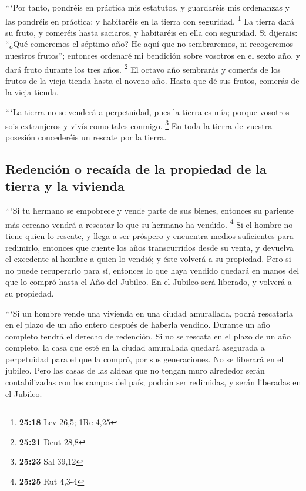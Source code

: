 \begin{paracol}{2}
 ``\,`Por tanto, pondréis en práctica mis estatutos, y
guardaréis mis ordenanzas y las pondréis en práctica; y habitaréis en la
tierra con seguridad. \footnote{\textbf{25:18} Lev 26,5; 1Re 4,25}
 La tierra dará su fruto, y comeréis hasta saciaros, y
habitaréis en ella con seguridad.  Si dijerais: ``¿Qué
comeremos el séptimo año? He aquí que no sembraremos, ni recogeremos
nuestros frutos'';  entonces ordenaré mi bendición sobre
vosotros en el sexto año, y dará fruto durante los tres años.
\footnote{\textbf{25:21} Deut 28,8}  El octavo año
sembrarás y comerás de los frutos de la vieja tienda hasta el noveno
año. Hasta que dé sus frutos, comerás de la vieja tienda.

 ``\,`La tierra no se venderá a perpetuidad, pues la
tierra es mía; porque vosotros sois extranjeros y vivís como tales
conmigo. \footnote{\textbf{25:23} Sal 39,12}  En toda la
tierra de vuestra posesión concederéis un rescate por la tierra.

\hypertarget{redenciuxf3n-o-recauxedda-de-la-propiedad-de-la-tierra-y-la-vivienda}{%
\subsection{Redención o recaída de la propiedad de la tierra y la
vivienda}\label{redenciuxf3n-o-recauxedda-de-la-propiedad-de-la-tierra-y-la-vivienda}}

 ``\,`Si tu hermano se empobrece y vende parte de sus
bienes, entonces su pariente más cercano vendrá a rescatar lo que su
hermano ha vendido. \footnote{\textbf{25:25} Rut 4,3-4} 
Si el hombre no tiene quien lo rescate, y llega a ser próspero y
encuentra medios suficientes para redimirlo,  entonces
que cuente los años transcurridos desde su venta, y devuelva el
excedente al hombre a quien lo vendió; y éste volverá a su propiedad.
 Pero si no puede recuperarlo para sí, entonces lo que
haya vendido quedará en manos del que lo compró hasta el Año del
Jubileo. En el Jubileo será liberado, y volverá a su propiedad.

 ``\,`Si un hombre vende una vivienda en una ciudad
amurallada, podrá rescatarla en el plazo de un año entero después de
haberla vendido. Durante un año completo tendrá el derecho de redención.
 Si no se rescata en el plazo de un año completo, la casa
que esté en la ciudad amurallada quedará asegurada a perpetuidad para el
que la compró, por sus generaciones. No se liberará en el jubileo.
 Pero las casas de las aldeas que no tengan muro
alrededor serán contabilizadas con los campos del país; podrán ser
redimidas, y serán liberadas en el Jubileo.


\end{paracol}
